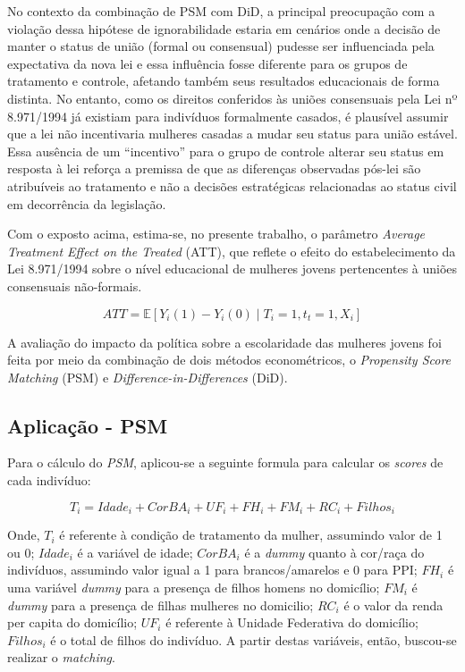 \documentclass[12pt,oneside,a4paper]{article}
\begin{document}
No contexto da combinação de PSM com DiD, a principal preocupação com a violação dessa hipótese de ignorabilidade estaria em cenários onde a decisão de manter o status de união (formal ou consensual) pudesse ser influenciada pela expectativa da nova lei e essa influência fosse diferente para os grupos de tratamento e controle, afetando também seus resultados educacionais de forma distinta. No entanto, como os direitos conferidos às uniões consensuais pela Lei nº 8.971/1994 já existiam para indivíduos formalmente casados, é plausível assumir que a lei não incentivaria mulheres casadas a mudar seu status para união estável. Essa ausência de um ``incentivo'' para o grupo de controle alterar seu status em resposta à lei reforça a premissa de que as diferenças observadas pós-lei são atribuíveis ao tratamento e não a decisões estratégicas relacionadas ao status civil em decorrência da legislação.

Com o exposto acima, estima-se, no presente trabalho, o parâmetro \textit{Average Treatment Effect on the Treated} (ATT), que reflete o efeito do estabelecimento da Lei 8.971/1994 sobre o nível educacional de mulheres jovens pertencentes à uniões consensuais não-formais.

$$ATT = \mathbb{E}[Y_i(1) - Y_i(0) \mid T_i = 1, t_t = 1, X_i]$$

A avaliação do impacto da política sobre a escolaridade das mulheres jovens foi feita por meio da combinação de dois métodos econométricos, o \textit{Propensity Score Matching} (PSM) e \textit{Difference-in-Differences} (DiD).

\subsection{Aplicação - PSM}

Para o cálculo do \textit{PSM}, aplicou-se a seguinte formula para calcular os \textit{scores} de cada indivíduo:

$$ T_i = Idade_i + CorBA_i + UF_i + FH_i + FM_i + RC_i + Filhos_i $$

Onde, \(T_i\) é referente à condição de tratamento da mulher, assumindo valor de 1 ou 0; \(Idade_i\) é a variável de idade; \(CorBA_i\) é a \textit{dummy} quanto à cor/raça do indivíduos, assumindo valor igual a 1 para brancos/amarelos e 0 para PPI; \(FH_i\) é uma variável \textit{dummy} para a presença de filhos homens no domicílio; \(FM_i\) é \textit{dummy} para a presença de filhas mulheres no domicilio; \(RC_i\) é o valor da renda per capita do domicílio; \(UF_i\) é referente à Unidade Federativa do domicílio; \(Filhos_i\) é o total de filhos do indivíduo. A partir destas variáveis, então, buscou-se realizar o \textit{matching}.
\end{document}
